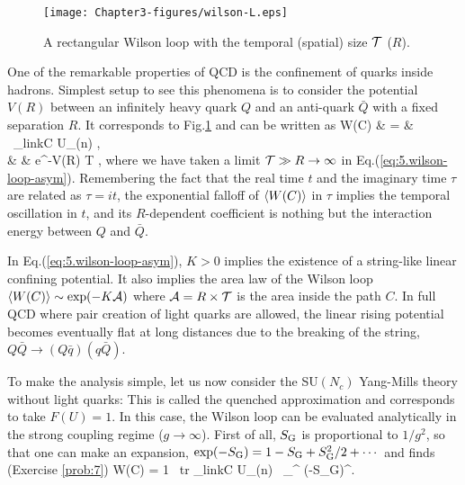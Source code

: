 \begin{figure}[t]
\begin{center}
\texttt{[image: Chapter3-figures/wilson-L.eps]}
 \end{center}
\caption{A rectangular  Wilson loop with the
 temporal (spatial) size ${\cal T}$ ($R$).}
\label{fig:wilson-L}
\end{figure}

One of the remarkable properties of QCD is the   confinement of quarks inside 
hadrons.  Simplest setup to see this phenomena is to consider
the potential $V(R)$ between  an infinitely heavy quark $Q$ and an anti-quark $\bar{Q}$ with
a fixed separation $R$.
It corresponds to Fig.\ref{fig:wilson-L} and can be written as
\beq
 \label{eq:5.wilson-loop-lattice}
\la W(C) \ra  
 & = & \ \prod_{{\rm link}\in C}  U_{\mu}(n) \ra , \\
 \label{eq:5.wilson-loop-asym}
 & \propto  & 
  {\rm e}^{-V(R) {\cal T} } \simeq 
 \exp {} ,
\eeq  
where we  have taken a limit     
${\cal T} \gg R \rightarrow \infty$ in   Eq.(\ref{eq:5.wilson-loop-asym}).
 Remembering the fact that the real time $t$ and the imaginary time $\tau$ are
 related as  $\tau=it$, the exponential falloff of  $\langle W(C) \rangle$ in $\tau$ implies the 
  temporal oscillation in $t$, and its $R$-dependent coefficient is nothing but the 
 interaction  energy between $Q$ and $\bar{Q}$.  
 
In Eq.(\ref{eq:5.wilson-loop-asym}), 
   $K > 0$  implies 
 the existence of a string-like
linear confining potential.
 It also implies 
 the area law  of the Wilson loop 
 $\langle W(C) \rangle \sim \exp(-K{\cal A})$
 where ${\cal A}= R \times {\cal T} $ is 
  the area inside the path $C$.
    In full QCD where pair creation of light quarks 
 are allowed,  
  the linear rising potential becomes eventually 
    flat at long distances due to the breaking of the string,
  $Q\bar{Q} \rightarrow (Q\bar{q})(q\bar{Q})$.
  
  To make the analysis simple, let us now consider the 
  SU$(N_c)$ Yang-Mills theory
  without light quarks: This is called the quenched 
  approximation and corresponds to take $F(U) =1$.
In this case,  the Wilson loop can be evaluated analytically
 in the strong coupling regime ($g \rightarrow \infty$).
First of all,  $S_{\rm G}$ is proportional to $1/g^2$,
so that  one can make an expansion,  
$\exp (-S_{\rm G}) = 1 - S_{\rm G}+ S_{\rm G}^2 /2 + \cdots $
 and finds (Exercise \ref{prob:7})
\beq
\label{eq:5.wilson-strong}
\la W(C) \ra = {1 }
 \int [dU] \ {\rm tr} \prod_{{\rm link}\in C} U_{\mu}(n) \  
 \sum_{}^{\infty}  (-S_{\rm G})^{\ell}.
\eeq
 
